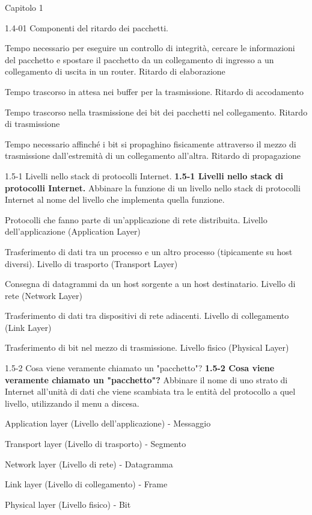\documentclass[a4paper]{article}
\begin{document}
\begin{quiz}{Capitolo 1}
\begin{matching}[points=1]{1.4-01 Componenti del ritardo dei pacchetti.}
\item Tempo necessario per eseguire un controllo di integrità, cercare le informazioni del pacchetto e spostare il pacchetto da un collegamento di ingresso a un collegamento di uscita in un router. \answer Ritardo di elaborazione
\item Tempo trascorso in attesa nei buffer per la trasmissione. \answer Ritardo di accodamento
\item Tempo trascorso nella trasmissione dei bit dei pacchetti nel collegamento. \answer Ritardo di trasmissione
\item Tempo necessario affinché i bit si propaghino fisicamente attraverso il mezzo di trasmissione dall'estremità di un collegamento all'altra. \answer Ritardo di propagazione
\end{matching}

\begin{matching}[points=1]{1.5-1 Livelli nello stack di protocolli Internet.}
\textbf{1.5-1 Livelli nello stack di protocolli Internet.}
Abbinare la funzione di un livello nello stack di protocolli Internet al nome del livello che implementa quella funzione.

\item Protocolli che fanno parte di un'applicazione di rete distribuita. \answer Livello dell'applicazione (Application Layer)
\item Trasferimento di dati tra un processo e un altro processo (tipicamente su host diversi). \answer Livello di trasporto (Transport Layer)
\item Consegna di datagrammi da un host sorgente a un host destinatario. \answer Livello di rete (Network Layer)
\item Trasferimento di dati tra dispositivi di rete adiacenti. \answer Livello di collegamento (Link Layer)
\item Trasferimento di bit nel mezzo di trasmissione. \answer Livello fisico (Physical Layer)
\end{matching}


\begin{matching}[points=1]{1.5-2 Cosa viene veramente chiamato un "pacchetto"?}
\textbf{1.5-2 Cosa viene veramente chiamato un "pacchetto"?}
Abbinare il nome di uno strato di Internet all'unità di dati che viene scambiata tra le entità del protocollo a quel livello, utilizzando il menu a discesa.

\item Application layer (Livello dell'applicazione) - Messaggio
\item Transport layer (Livello di trasporto) - Segmento
\item Network layer (Livello di rete) - Datagramma
\item Link layer (Livello di collegamento) - Frame
\item Physical layer (Livello fisico) - Bit
\end{matching}



\end{quiz}
\end{document}
